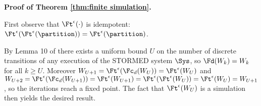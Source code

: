 {\large \textbf{Proof of Theorem \ref{thm:finite simulation}.}}
\begin{prf}
	First observe that $\Ft^\epsilon(\cdot)$ is idempotent: $\Ft^\epsilon(\Ft^\epsilon(\partition)) = \Ft^\epsilon(\partition)$.
	
By Lemma 10 of \cite{VladimerouPVD08_STORMED} there exists a uniform bound $U$ on the number of discrete transitions of any execution of the STORMED system $\Sys$, so $\Fd(W_k) = W_k$ for all $k\geq U$.
Moreover 
$W_{U+1} = \Ft^\epsilon(\Fc_d(W_U)) = \Ft^\epsilon(W_U)$
and $W_{U+2}= \Ft^\epsilon(\Fc_d(W_{U+1}))= \Ft^\epsilon(W_{U+1})= \Ft^\epsilon(\Ft^\epsilon(W_U)) = \Ft^\epsilon(W_U) = W_{U+1}$, so the iterations reach a fixed point.
The fact that $\Ft^\epsilon(W_U)$ is a simulation then yields the desired result.
\end{prf}